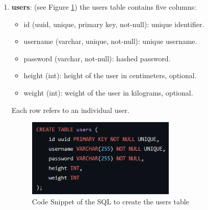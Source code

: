             \begin{enumerate}
                \item \textbf{users}:  (see Figure \ref{fig:users}) the users table contains five columns: 
                    \begin{itemize}
                        \item id (uuid, unique, primary key, not-null): unique identifier.
                        \item username (varchar, unique, not-null): unique username.
                        \item password (varchar, not-null): hashed password.
                        \item height (int): height of the user in centimeters, optional.
                        \item weight (int): weight of the user in kilograms, optional.
                    \end{itemize}
                    Each row refers to an individual user.
                    \begin{figure}[htbp]
                            \centering
                            \includegraphics[width=0.67\textwidth]{figures/users.png}
                            \caption{Code Snippet of the SQL to create the users table}
                            \label{fig:users}
                    \end{figure}
                

\end{enumerate}
